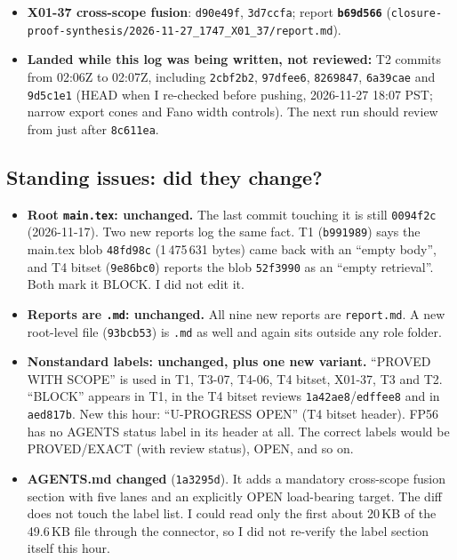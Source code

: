 \documentclass[11pt]{article}
\theoremstyle{definition}
\theoremstyle{remark}
\begin{document}
\begin{itemize}
report \textbf{\texttt{90c4907}} (\texttt{flow-plateau-research/2026-11-27\_FP56\_cross\_scope\_energy/report.md}).
\item \textbf{X01-37 cross-scope fusion}: \texttt{d90e49f}, \texttt{3d7ccfa}; report
\textbf{\texttt{b69d566}} (\texttt{closure-proof-synthesis/2026-11-27\_1747\_X01\_37/report.md}).
\item \textbf{Landed while this log was being written, not reviewed:} T2 commits from
02:06Z to 02:07Z, including \texttt{2cbf2b2}, \texttt{97dfee6}, \texttt{8269847},
\texttt{6a39cae} and \texttt{9d5c1e1} (HEAD when I re-checked before pushing,
2026-11-27 18:07 PST; narrow export cones and Fano width controls). The next run should
review from just after \texttt{8c611ea}.
\end{itemize}

\subsection{Standing issues: did they change?}
\begin{itemize}
\item \textbf{Root \texttt{main.tex}: unchanged.} The last commit touching it is still
\texttt{0094f2c} (2026-11-17). Two new reports log the same fact. T1 (\texttt{b991989})
says the main.tex blob \texttt{48fd98c} (1\,475\,631 bytes) came back with an ``empty body'',
and T4 bitset (\texttt{9e86bc0}) reports the blob \texttt{52f3990} as an ``empty retrieval''.
Both mark it BLOCK. I did not edit it.
\item \textbf{Reports are \texttt{.md}: unchanged.} All nine new reports are
\texttt{report.md}. A new root-level file (\texttt{93bcb53}) is \texttt{.md} as well and
again sits outside any role folder.
\item \textbf{Nonstandard labels: unchanged, plus one new variant.} ``PROVED WITH SCOPE''
is used in T1, T3-07, T4-06, T4 bitset, X01-37, T3 and T2. ``BLOCK'' appears in T1, in the
T4 bitset reviews \texttt{1a42ae8}/\texttt{edffee8} and in \texttt{aed817b}. New this
hour: ``U-PROGRESS OPEN'' (T4 bitset header). FP56 has no AGENTS status label in its
header at all. The correct labels would be PROVED/EXACT (with review status), OPEN, and
so on.
\item \textbf{AGENTS.md changed} (\texttt{1a3295d}). It adds a mandatory cross-scope fusion
section with five lanes and an explicitly OPEN load-bearing target. The diff does not
touch the label list. I could read only the first about 20\,KB of the 49.6\,KB file
through the connector, so I did not re-verify the label section itself this hour.
\end{itemize}
\end{document}
